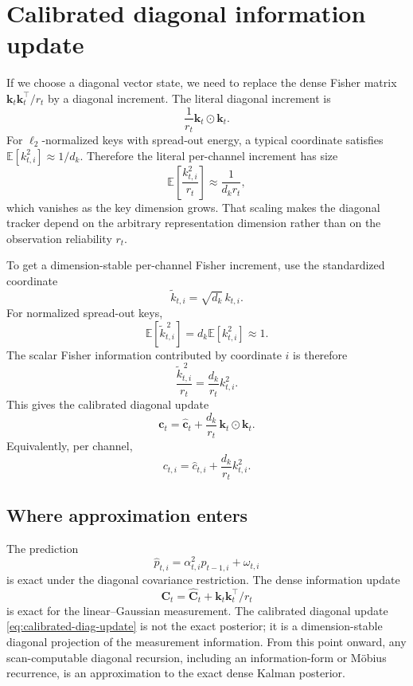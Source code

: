 \documentclass[11pt]{article}
\newcommand{\ve}[1]{\boldsymbol{#1}}
\newcommand{\tr}{\intercal}
\begin{document}
\section{Calibrated diagonal information update}

If we choose a diagonal vector state, we need to replace the dense Fisher matrix
$\ve{k}_t\ve{k}_t^{\tr}/r_t$ by a diagonal increment. The literal diagonal increment is
\[
  \frac{1}{r_t}\ve{k}_t\odot\ve{k}_t.
\]
For $\ell_2$-normalized keys with spread-out energy, a typical coordinate satisfies
$\mathbb{E}[k_{t,i}^2]\approx 1/d_k$. Therefore the literal per-channel increment has size
\[
  \mathbb{E}\!\left[\frac{k_{t,i}^2}{r_t}\right]
  \approx
  \frac{1}{d_k r_t},
\]
which vanishes as the key dimension grows. That scaling makes the diagonal tracker depend on
the arbitrary representation dimension rather than on the observation reliability $r_t$.

To get a dimension-stable per-channel Fisher increment, use the standardized coordinate
\[
  \widetilde{k}_{t,i}=\sqrt{d_k}\,k_{t,i}.
\]
For normalized spread-out keys,
\[
  \mathbb{E}[\widetilde{k}_{t,i}^{\,2}]
  =
  d_k\mathbb{E}[k_{t,i}^2]
  \approx 1.
\]
The scalar Fisher information contributed by coordinate $i$ is therefore
\[
  \frac{\widetilde{k}_{t,i}^{\,2}}{r_t}
  =
  \frac{d_k}{r_t}k_{t,i}^2.
\]
This gives the calibrated diagonal update
\begin{equation}
  \boxed{
  \ve{c}_t
  =
  \widehat{\ve{c}}_t
  +
  \frac{d_k}{r_t}\,\ve{k}_t\odot\ve{k}_t.
  }
  \label{eq:calibrated-diag-update}
\end{equation}
Equivalently, per channel,
\begin{equation}
  c_{t,i}
  =
  \widehat{c}_{t,i}
  +
  \frac{d_k}{r_t}k_{t,i}^2.
  \label{eq:calibrated-diag-update-coordinate}
\end{equation}

\subsection*{Where approximation enters}

The prediction
\[
  \widehat{p}_{t,i}=\alpha_{t,i}^2p_{t-1,i}+\omega_{t,i}
\]
is exact under the diagonal covariance restriction. The dense information update
\[
  \ve{C}_t
  =
  \widehat{\ve{C}}_t+\ve{k}_t\ve{k}_t^{\tr}/r_t
\]
is exact for the linear--Gaussian measurement. The calibrated diagonal update
\eqref{eq:calibrated-diag-update} is not the exact posterior; it is a dimension-stable
diagonal projection of the measurement information. From this point onward, any
scan-computable diagonal recursion, including an information-form or M\"obius recurrence,
is an approximation to the exact dense Kalman posterior.
\end{document}
